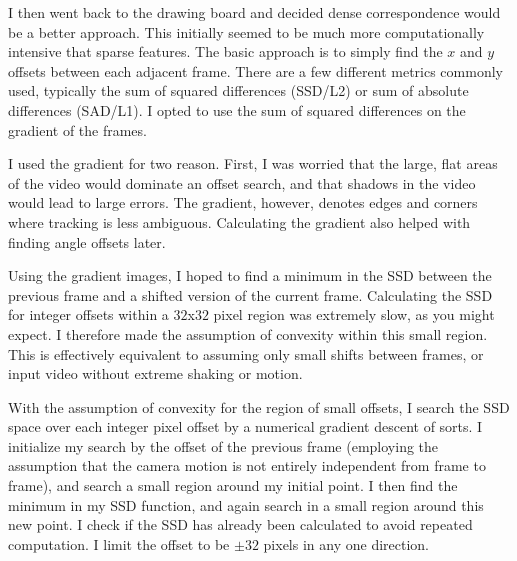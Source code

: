 \documentclass{article}
\begin{document}
I then went back to the drawing board and decided dense correspondence would be a better approach. This initially seemed to be much more computationally intensive that sparse features. The basic approach is to simply find the $x$ and $y$ offsets between each adjacent frame. There are a few different metrics commonly used, typically the sum of squared differences (SSD/L2) or sum of absolute differences (SAD/L1). I opted to use the sum of squared differences on the gradient of the frames. 

I used the gradient for two reason. First, I was worried that the large, flat areas of the video would dominate an offset search, and that shadows in the video would lead to large errors. The gradient, however, denotes edges and corners where tracking is less ambiguous. Calculating the gradient also helped with finding angle offsets later.

Using the gradient images, I hoped to find a minimum in the SSD between the previous frame and a shifted version of the current frame. Calculating the SSD for integer offsets within a $32$x$32$ pixel region was extremely slow, as you might expect. I therefore made the assumption of convexity within this small region. This is effectively equivalent to assuming only small shifts between frames, or input video without extreme shaking or motion.

With the assumption of convexity for the region of small offsets, I search the SSD space over each integer pixel offset by a numerical gradient descent of sorts. I initialize my search by the offset of the previous frame (employing the assumption that the camera motion is not entirely independent from frame to frame), and search a small region around my initial point. I then find the minimum in my SSD function, and again search in a small region around this new point. I check if the SSD has already been calculated to avoid repeated computation. I limit the offset to be $\pm32$ pixels in any one direction.
\end{document}

